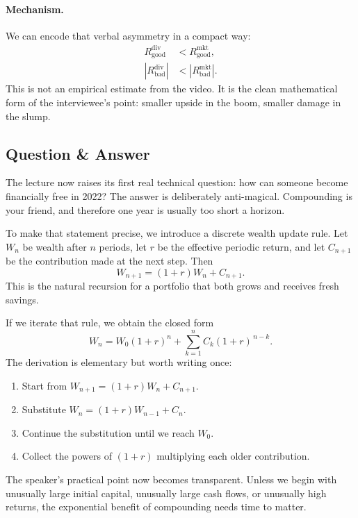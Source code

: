 \paragraph{Mechanism.}
We can encode that verbal asymmetry in a compact way:
\begin{align}
R_{\text{good}}^{\text{div}} &< R_{\text{good}}^{\text{mkt}}, \\
\left|R_{\text{bad}}^{\text{div}}\right| &< \left|R_{\text{bad}}^{\text{mkt}}\right|.
\end{align}
This is not an empirical estimate from the video. It is the clean mathematical form of the interviewee's point: smaller upside in the boom, smaller damage in the slump.

\subsection{Question \& Answer}

The lecture now raises its first real technical question: how can someone become financially free in 2022? The answer is deliberately anti-magical. Compounding is your friend, and therefore one year is usually too short a horizon.

To make that statement precise, we introduce a discrete wealth update rule. Let \(W_n\) be wealth after \(n\) periods, let \(r\) be the effective periodic return, and let \(C_{n+1}\) be the contribution made at the next step. Then
\begin{equation}
W_{n+1} = (1+r)W_n + C_{n+1}.
\end{equation}
This is the natural recursion for a portfolio that both grows and receives fresh savings.

If we iterate that rule, we obtain the closed form
\begin{equation}
W_n = W_0(1+r)^n + \sum_{k=1}^{n} C_k (1+r)^{\,n-k}.
\end{equation}
The derivation is elementary but worth writing once:
\begin{enumerate}
\item Start from \(W_{n+1} = (1+r)W_n + C_{n+1}\).
\item Substitute \(W_n = (1+r)W_{n-1} + C_n\).
\item Continue the substitution until we reach \(W_0\).
\item Collect the powers of \((1+r)\) multiplying each older contribution.
\end{enumerate}
The speaker's practical point now becomes transparent. Unless we begin with unusually large initial capital, unusually large cash flows, or unusually high returns, the exponential benefit of compounding needs time to matter.

